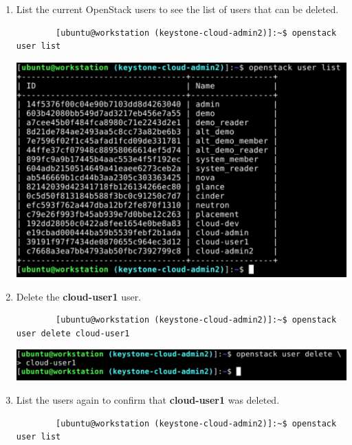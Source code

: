 \documentclass[letterpaper, 12pt]{article}
\begin{document}
\begin{enumerate}
    \item List the current OpenStack users to see the list of users that can be deleted.
    \begin{lstlisting}
        [ubuntu@workstation (keystone-cloud-admin2)]:~$ openstack user list
    \end{lstlisting}

    \begin{center}
        \includegraphics[width=\linewidth]{images/part6/step8.png}
    \end{center}

    \item Delete the \textbf{cloud-user1} user.
    \begin{lstlisting}
        [ubuntu@workstation (keystone-cloud-admin2)]:~$ openstack user delete cloud-user1
    \end{lstlisting}

    \begin{center}
        \includegraphics[width=\linewidth]{images/part6/step9.png}
    \end{center}

    \item List the users again to confirm that \textbf{cloud-user1} was deleted.
    \begin{lstlisting}
        [ubuntu@workstation (keystone-cloud-admin2)]:~$ openstack user list
    \end{lstlisting}


\end{enumerate}
\end{document}
